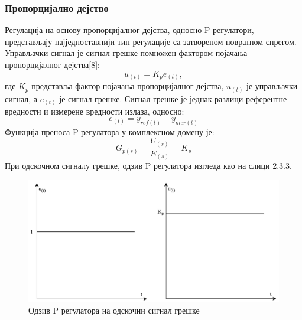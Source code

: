 \documentclass[12pt]{article}
\begin{document}
\subsubsection{Пропорцијално дејство}
Регулација на основу пропорцијалног дејства, односно P регулатори, представљају најједноставнији тип регулације са затвореном повратном спрегом. Управљачки сигнал је сигнал грешке помножен фактором појачања пропорцијалног дејства[8]:
\begin{equation}
    u_{(t)} = K_p e_{(t)},
\end{equation}
где $K_p$ представља фактор појачања пропорцијалног дејства, $u_{(t)}$ је управљачки сигнал, а $e_{(t)}$ је сигнал грешке. Сигнал грешке је једнак разлици референтне вредности и измерене вредности излаза, односно:
\begin{equation}
    e_{(t)}=y_{ref(t)} - y_{mer(t)}
\end{equation}
Функција преноса P регулатора у комплексном домену је:
\begin{equation}
    G_{p(s)} = \dfrac{U_{(s)}}{E_{(s)}} = K_p
\end{equation}
При одскочном сигналу грешке, одзив P регулатора изгледа као на слици 2.3.3.
\begin{figure}[H]
    \centering
    \includegraphics[width=13cm]{figures/p.drawio.png}
    \caption{Одзив P регулатора на одскочни сигнал грешке}
    \label{fig:P_одзив}
\end{figure}
\end{document}
